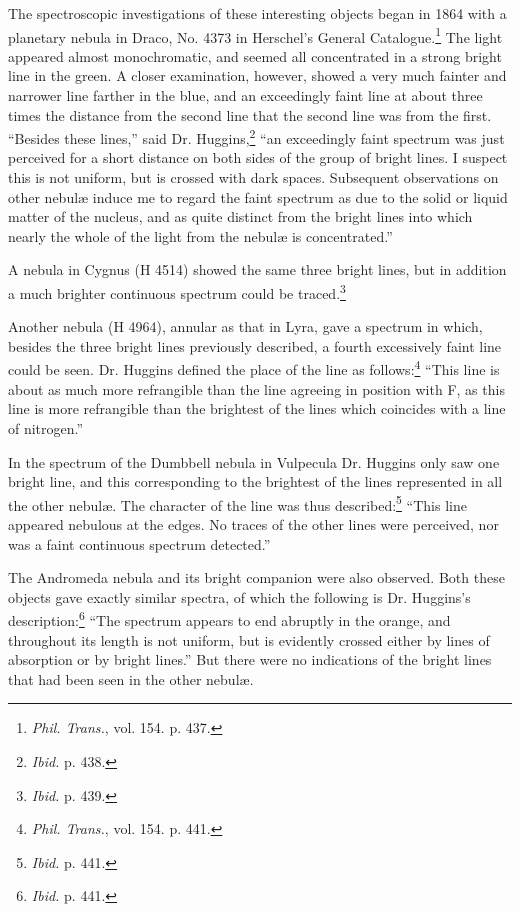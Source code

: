 \documentclass[a4paper, 12pt, oneside, polutonikogreek, english]{article}
\begin{document}
The spectroscopic investigations of these interesting objects began in 1864 with a planetary nebula in Draco, No. 4373 in Herschel's General Catalogue.\footnote{\emph{Phil. Trans.}, vol. 154. p. 437.} The light appeared almost monochromatic, and seemed all concentrated in a strong bright line in the green. A closer examination, however, showed a very much fainter and narrower line farther in the blue, and an exceedingly faint line at about three times the distance from the second line that the second line was from the first. ``Besides these lines,'' said Dr. Huggins,\footnote{\emph{Ibid.} p. 438.} ``an exceedingly faint spectrum was just perceived for a short distance on both sides of the group of bright lines. I suspect this is not uniform, but is crossed with dark spaces. Subsequent observations on other nebulæ induce me to regard the faint spectrum as due to the solid or liquid matter of the nucleus, and as quite distinct from the bright lines into which nearly the whole of the light from the nebulæ is concentrated.''

A nebula in Cygnus (H 4514) showed the same three bright lines, but in addition a much brighter continuous spectrum could be traced.\footnote{\emph{Ibid.} p. 439.}

Another nebula (H 4964), annular as that in Lyra, gave a spectrum in which, besides the three bright lines previously described, a fourth excessively faint line could be seen. Dr. Huggins defined the place of the line as follows:\footnote{\emph{Phil. Trans.}, vol. 154. p. 441.} ``This line is about as much more refrangible than the line agreeing in position with F, as this line is more refrangible than the brightest of the lines which coincides with a line of nitrogen.''

In the spectrum of the Dumbbell nebula in Vulpecula Dr. Huggins only saw one bright line, and this corresponding to the brightest of the lines represented in all the other nebulæ. The character of the line was thus described:\footnote{\emph{Ibid.} p. 441.} ``This line appeared nebulous at the edges. No traces of the other lines were perceived, nor was a faint continuous spectrum detected.''

The Andromeda nebula and its bright companion were also observed. Both these objects gave exactly similar spectra, of which the following is Dr. Huggins's description:\footnote{\emph{Ibid.} p. 441.} ``The spectrum appears to end abruptly in the orange, and throughout its length is not uniform, but is evidently crossed either by lines of absorption or by bright lines.'' But there were no indications of the bright lines that had been seen in the other nebulæ.
\end{document}
